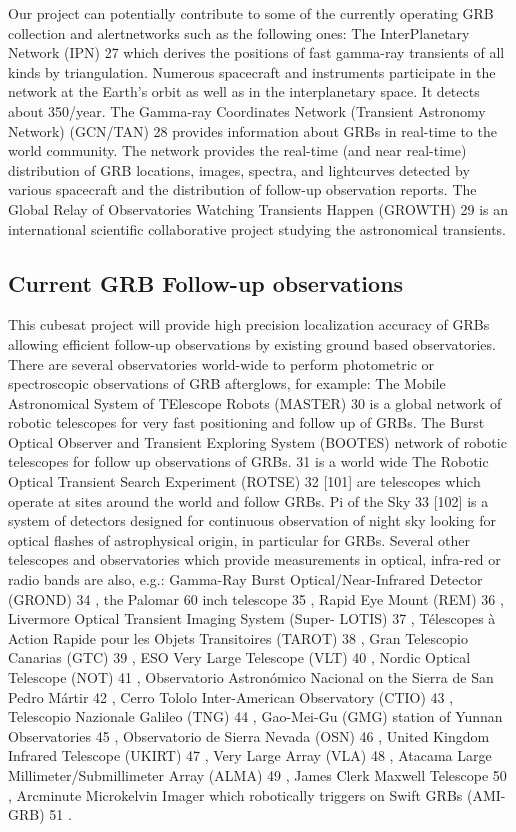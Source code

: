 \documentclass[12pt, a4paper,titlepage]{article}
\numberwithin{equation}{section}
\numberwithin{figure}{section}
\begin{document}
Our project can potentially contribute to some of the currently operating GRB collection and alertnetworks such as the following ones:
The InterPlanetary Network (IPN) 27 \cite{grb42} which derives the positions of fast gamma-ray transients of all kinds by triangulation. Numerous spacecraft and instruments participate in the network at the Earth’s orbit as well as in the interplanetary space. It detects about 350/year.
The Gamma-ray Coordinates Network (Transient Astronomy Network) (GCN/TAN) 28 provides information about GRBs in real-time to the world community. The network provides the real-time (and near real-time) distribution of GRB locations, images, spectra, and lightcurves detected by various spacecraft and the distribution of follow-up observation reports.
The Global Relay of Observatories Watching Transients Happen (GROWTH) 29 is an international scientific collaborative project studying the astronomical transients.

\subsection{Current GRB Follow-up observations}

This cubesat project will provide high precision localization accuracy of GRBs allowing efficient follow-up observations by existing ground based observatories. There are several observatories world-wide to perform photometric or spectroscopic observations of GRB afterglows, for example:
The Mobile Astronomical System of TElescope Robots (MASTER) 30 \cite{grb43} is a global network of robotic telescopes for very fast positioning and follow up of GRBs.
The Burst Optical Observer and Transient Exploring System (BOOTES) network of robotic telescopes for follow up observations of GRBs. 31 \cite{grb44} is a world wide The Robotic Optical Transient Search Experiment (ROTSE) 32 [101] are telescopes which operate at
sites around the world and follow GRBs.
Pi of the Sky 33 [102] is a system of detectors designed for continuous observation of night sky looking for optical flashes of astrophysical origin, in particular for GRBs.
Several other telescopes and observatories which provide measurements in optical, infra-red or radio bands are also, e.g.: Gamma-Ray Burst Optical/Near-Infrared Detector (GROND) 34 , the Palomar 60 inch telescope 35 , Rapid Eye Mount (REM) 36 , Livermore Optical Transient Imaging System (Super- LOTIS) 37 , Télescopes à Action Rapide pour les Objets Transitoires (TAROT) 38 , Gran Telescopio Canarias (GTC) 39 , ESO Very Large Telescope (VLT) 40 , Nordic Optical Telescope (NOT) 41 , Observatorio Astronómico Nacional on the Sierra de San Pedro Mártir 42 , Cerro Tololo Inter-American Observatory (CTIO) 43 , Telescopio Nazionale Galileo (TNG) 44 , Gao-Mei-Gu (GMG) station of Yunnan Observatories 45 , Observatorio de Sierra Nevada (OSN) 46 , United Kingdom Infrared Telescope (UKIRT) 47 , Very Large Array (VLA) 48 , Atacama Large Millimeter/Submillimeter Array (ALMA) 49 , James Clerk Maxwell Telescope 50 , Arcminute Microkelvin Imager which robotically triggers on Swift GRBs (AMI-GRB) 51 .
\end{document}
